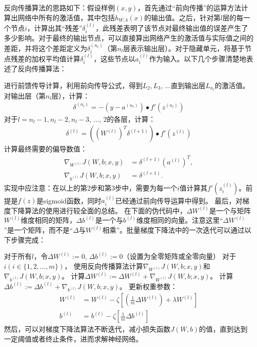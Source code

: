 反向传播算法的思路如下：假设样例$(x,y)$，首先通过“前向传播”的运算方法计算出网络中所有的激活值，其中包括$h_{W,b}(x)$的输出值。之后，针对第$l$层的每一个节点$i$，计算出其“残差”$\delta^{(l)}_i$，此残差表明了该节点对最终输出值的误差产生了多少影响。对于最终的输出节点，可以直接算出网络产生的激活值与实际值之间的差距，并将这个差距定义为$\delta^{(n_l)}_i$（第$n_l$层表示输出层）。对于隐藏单元，将基于节点残差的加权平均值计算$\delta^{(l)}_i$，这些节点以$a^{(l)}_i$作为输入。以下几个步骤清楚地表述了反向传播算法：\par
进行前馈传导计算，利用前向传导公式，得到$L_2, L_3$, $\ldots$直到输出层$L_{n_l}$的激活值。
对输出层（第$n_l$层），计算：
\begin{align}
	\delta^{(n_l)}
	= - (y - a^{(n_l)}) \bullet f'(z^{(n_l)})
\end{align}
对于$l = n_l-1, n_l-2, n_l-3$, $\ldots$, $2$的各层，计算：
\begin{align}
	\delta^{(l)} = \left((W^{(l)})^T \delta^{(l+1)}\right) \bullet f'(z^{(l)})
\end{align}
计算最终需要的偏导数值：
\begin{align}
	\nabla_{W^{(l)}} J(W,b;x,y) &= \delta^{(l+1)} (a^{(l)})^T, \\
	\nabla_{b^{(l)}} J(W,b;x,y) &= \delta^{(l+1)}.
\end{align}
实现中应注意：在以上的第2步和第3步中，需要为每一个$i$值计算其$f'(z^{(l)}_i)$。前提是$f(z)$是sigmoid函数，同时$a^{(l)}_i$已经通过前向传导运算中得到。
最后，对梯度下降算法的使用进行较全面的总结。
在下面的伪代码中，$\Delta W^{(l)}$是一个与矩阵$W^{(l)}$维度相同的矩阵，$\Delta b^{(l)}$是一个与$b^{(l)}$维度相同的向量。注意这里“$\Delta W^{(l)}$”是一个矩阵，而不是“$ \Delta$与$W^{(l)}$相乘”。批量梯度下降法中的一次迭代可以通过以下步骤完成：\par

对于所有$l$，令$\Delta W^{(l)} := 0$, $\Delta b^{(l)} := 0 $（设置为全零矩阵或全零向量）
对于$i(i \in \{1, 2, ..., m\})$，
使用反向传播算法计算$\nabla_{W^{(l)}} J(W,b;x,y)$和$\nabla_{b^{(l)}} J(W,b;x,y)$。
计算$\Delta W^{(l)} := \Delta W^{(l)} + \nabla_{W^{(l)}} J(W,b;x,y)$。
计算$\Delta b^{(l)} := \Delta b^{(l)} + \nabla_{b^{(l)}} J(W,b;x,y)$。
更新权重参数：
\begin{align}
	W^{(l)} &= W^{(l)} - \zeta \left[ \left(\frac{1}{m} \Delta W^{(l)} \right) + \lambda W^{(l)}\right] \\
	b^{(l)} &= b^{(l)} - \zeta \left[\frac{1}{m} \Delta b^{(l)}\right]
\end{align}
然后，可以对梯度下降法算法不断迭代，减小损失函数$J(W,b)$的值，直到达到一定阈值或者终止条件，进而求解神经网络。

